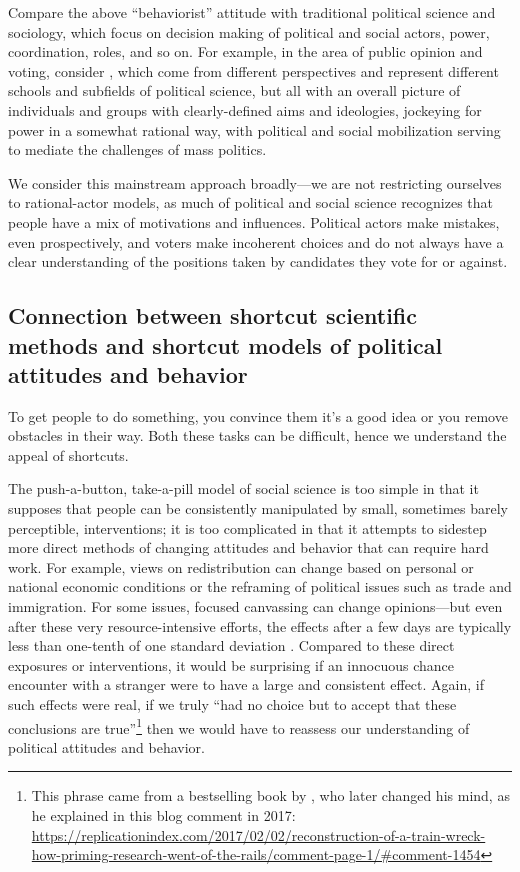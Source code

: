 \documentclass[11pt,letterpaper]{article}
\begin{document}
Compare the above ``behaviorist'' attitude with traditional political science
and sociology, which focus on decision making of political and social actors,
power, coordination, roles, and so on. For example, in the area of public
opinion and voting, consider
\citet{ferguson1995,uhlaner1989,hirano2010,lax2009,ashworth2014}, which come
from different perspectives and represent different schools and subfields of
political science, but all with an overall picture of individuals and groups
with clearly-defined aims and ideologies, jockeying for power in a somewhat
rational way, with political and social mobilization serving to mediate the
challenges of mass politics.

We consider this mainstream approach broadly---we are not restricting ourselves
to rational-actor models, as much of political and social science recognizes
that people have a mix of motivations and influences. Political actors make
mistakes, even prospectively, and voters make incoherent choices and do not
always have a clear understanding of the positions taken by candidates they vote
for or against.

\subsection{Connection between shortcut scientific methods and shortcut models
of political attitudes and behavior}

To get people to do something, you convince them it's a good idea or you remove
obstacles in their way. Both these tasks can be difficult, hence we understand
the appeal of shortcuts.

The push-a-button, take-a-pill model of social science is too simple in that it
supposes that people can be consistently manipulated by small, sometimes barely
perceptible, interventions; it is too complicated in that it attempts to
sidestep more direct methods of changing attitudes and behavior that can require
hard work. For example, views on redistribution can change based on personal or
national economic conditions or the reframing of political issues such as trade
and immigration. For some issues, focused canvassing can change opinions---but
even after these very resource-intensive efforts, the effects after a few days
are typically less than one-tenth of one standard deviation
\citep{kalla2020}. Compared to these direct exposures or interventions, it would
be surprising if an innocuous chance encounter with a stranger were to have a
large and consistent effect. Again, if such effects were real, if we truly ``had
no choice but to accept that these conclusions are true''\footnote{This phrase
came from a bestselling book by \citet{kahneman2011}, who later changed his
mind, as he explained in this blog comment in 2017:
\url{https://replicationindex.com/2017/02/02/reconstruction-of-a-train-wreck-how-priming-research-went-of-the-rails/comment-page-1/\#comment-1454}}
then we would have to reassess our understanding of political attitudes and
behavior.
\end{document}
